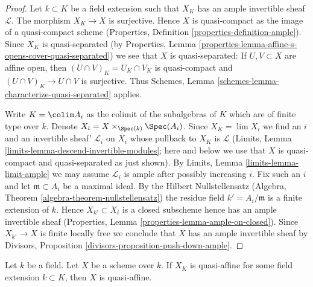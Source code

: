 \begin{proof}
Let $k \subset K$ be a field extension such that $X_K$ has
an ample invertible sheaf $\mathcal{L}$.
The morphism $X_K \to X$ is surjective. Hence $X$ is quasi-compact
as the image of a quasi-compact scheme (Properties, Definition
\ref{properties-definition-ample}). Since $X_K$ is quasi-separated
(by Properties, Lemma
\ref{properties-lemma-affine-s-opens-cover-quasi-separated})
we see that $X$ is quasi-separated: If $U, V \subset X$ are
affine open, then $(U \cap V)_K = U_K \cap V_K$ is quasi-compact
and $(U \cap V)_K \to U \cap V$ is surjective. Thus
Schemes, Lemma \ref{schemes-lemma-characterize-quasi-separated} applies.

\medskip\noindent
Write $K = \colim A_i$ as the colimit of the subalgebras of $K$
which are of finite type over $k$. Denote
$X_i = X \times_{\Spec(k)} \Spec(A_i)$.
Since $X_K = \lim X_i$ we find an $i$ and an invertible sheaf'
$\mathcal{L}_i$ on $X_i$ whose pullback to $X_K$ is $\mathcal{L}$
(Limits, Lemma \ref{limits-lemma-descend-invertible-modules};
here and below we use that $X$ is quasi-compact and quasi-separated as
just shown). By Limits, Lemma \ref{limits-lemma-limit-ample}
we may assume $\mathcal{L}_i$ is ample after possibly increasing $i$.
Fix such an $i$ and let $\mathfrak m \subset A_i$ be a maximal
ideal. By the Hilbert Nullstellensatz
(Algebra, Theorem \ref{algebra-theorem-nullstellensatz})
the residue field $k' = A_i/\mathfrak m$ is a finite
extension of $k$. Hence $X_{k'} \subset X_i$ is a closed subscheme
hence has an ample invertible sheaf
(Properties, Lemma \ref{properties-lemma-ample-on-closed}).
Since $X_{k'} \to X$ is finite locally free we conclude
that $X$ has an ample invertible sheaf by
Divisors, Proposition \ref{divisors-proposition-push-down-ample}.
\end{proof}

\begin{lemma}
\label{lemma-quasi-affine-after-field-extension}
Let $k$ be a field. Let $X$ be a scheme over $k$. If $X_K$ is quasi-affine
for some field extension $k \subset K$, then $X$ is quasi-affine.
\end{lemma}

